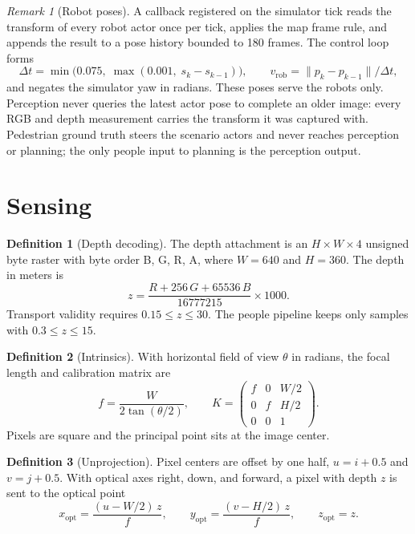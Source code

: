 \documentclass[10pt,a4paper]{article}
\theoremstyle{plain}
\theoremstyle{definition}
\newtheorem{definition}{Definition}[section]
\theoremstyle{remark}
\newtheorem{remark}{Remark}[section]
\begin{document}
\begin{remark}[Robot poses]\label{rem:pose}
A callback registered on the simulator tick reads the transform of every robot actor once per tick, applies the map frame rule, and appends the result to a pose history bounded to 180 frames. The control loop forms
\begin{equation}
\Delta t = \min\bigl(0.075,\; \max(0.001,\; s_k - s_{k-1})\bigr), \qquad
v_{\mathrm{rob}} = \|p_k - p_{k-1}\| / \Delta t,
\end{equation}
and negates the simulator yaw in radians. These poses serve the robots only. Perception never queries the latest actor pose to complete an older image: every RGB and depth measurement carries the transform it was captured with. Pedestrian ground truth steers the scenario actors and never reaches perception or planning; the only people input to planning is the perception output.
\end{remark}

\section{Sensing}

\begin{definition}[Depth decoding]\label{def:depth}
The depth attachment is an $H \times W \times 4$ unsigned byte raster with byte order B, G, R, A, where $W = 640$ and $H = 360$. The depth in meters is
\begin{equation}
z = \frac{R + 256\,G + 65536\,B}{16777215} \times 1000 .
\end{equation}
Transport validity requires $0.15 \le z \le 30$. The people pipeline keeps only samples with $0.3 \le z \le 15$.
\end{definition}

\begin{definition}[Intrinsics]\label{prop:intrinsics}
With horizontal field of view $\theta$ in radians, the focal length and calibration matrix are
\begin{equation}
f = \frac{W}{2 \tan(\theta/2)}, \qquad
K = \begin{pmatrix} f & 0 & W/2 \\ 0 & f & H/2 \\ 0 & 0 & 1 \end{pmatrix}.
\end{equation}
Pixels are square and the principal point sits at the image center.
\end{definition}

\begin{definition}[Unprojection]\label{def:unproj}
Pixel centers are offset by one half, $u = i + 0.5$ and $v = j + 0.5$. With optical axes right, down, and forward, a pixel with depth $z$ is sent to the optical point
\begin{equation}
x_{\mathrm{opt}} = \frac{(u - W/2)\,z}{f}, \qquad
y_{\mathrm{opt}} = \frac{(v - H/2)\,z}{f}, \qquad
z_{\mathrm{opt}} = z .
\end{equation}
\end{definition}
\end{document}
